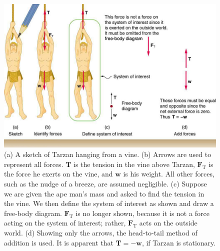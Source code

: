 \documentclass[
]{book}
\begin{document}
\begin{figure}
\hypertarget{import-auto-id1669409}{%
\centering
\includegraphics{images/Figure 04_06_01.jpg}
\caption{(a) A sketch of Tarzan hanging from a vine. (b) Arrows are used to
represent all forces. \(\textbf{T}{}\) is the tension in the vine above
Tarzan, \(\textbf{F}_{\text{T}}{}\) is the force he exerts on the vine,
and \(\textbf{w}{}\) is his weight. All other forces, such as the nudge of
a breeze, are assumed negligible. (c) Suppose we are given the ape man's
mass and asked to find the tension in the vine. We then define the
system of interest as shown and draw a free-body diagram.
\(\textbf{F}_{\text{T}}{}\) is no longer shown, because it is not a force
acting on the system of interest; rather, \(\textbf{F}_{\text{T}}{}\) acts
on the outside world. (d) Showing only the arrows, the head-to-tail
method of addition is used. It is apparent that
\({\textbf{T} = - \mathbf{w}}{}\), if Tarzan is
stationary.}\label{import-auto-id1669409}
}
\end{figure}
\end{document}
